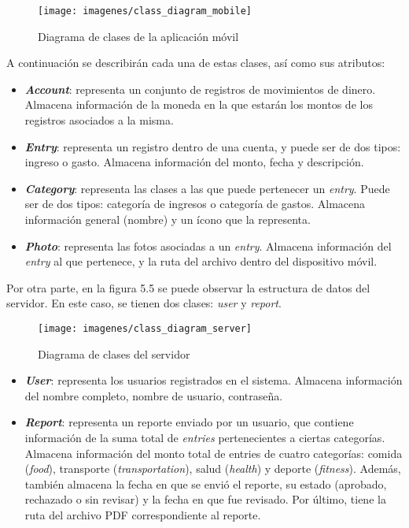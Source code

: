 \begin{figure}[ht]
  \centering
  \texttt{[image: imagenes/class\_diagram\_mobile]}
  \caption{Diagrama de clases de la aplicación móvil}
  \label{fig:classDiagramMobile}
\end{figure}

A continuación se describirán cada una de estas clases, así como sus atributos:

\begin{itemize}
	\item \textbf{\textit{Account}}: representa un conjunto de registros de movimientos de dinero. Almacena información de la moneda en la que estarán los montos de los registros asociados a la misma.
	\item \textbf{\textit{Entry}}: representa un registro dentro de una cuenta, y puede ser de dos tipos: ingreso o gasto. Almacena información del monto, fecha y descripción.
	\item \textbf{\textit{Category}}: representa las clases a las que puede pertenecer un \textit{entry}. Puede ser de dos tipos: categoría de ingresos o categoría de gastos. Almacena información general (nombre) y un ícono que la representa.
	\item \textbf{\textit{Photo}}: representa las fotos asociadas a un \textit{entry}. Almacena información del \textit{entry} al que pertenece, y la ruta del archivo dentro del dispositivo móvil.
\end{itemize}

Por otra parte, en la figura 5.5 se puede observar la estructura de datos del servidor. En este caso, se tienen dos clases: \textit{user} y \textit{report}.

\begin{figure}[ht]
  \centering
  \texttt{[image: imagenes/class\_diagram\_server]}
  \caption{Diagrama de clases del servidor}
  \label{fig:classDiagramServer}
\end{figure}


\begin{itemize}
	\item \textbf{\textit{User}}: representa los usuarios registrados en el sistema. Almacena información del nombre completo, nombre de usuario, contraseña.
	\item \textbf{\textit{Report}}: representa un reporte enviado por un usuario, que contiene información de la suma total de \textit{entries} pertenecientes a ciertas categorías. Almacena información del monto total de entries de cuatro categorías: comida (\textit{food}), transporte (\textit{transportation}), salud (\textit{health}) y deporte (\textit{fitness}). Además, también almacena la fecha en que se envió el reporte, su estado (aprobado, rechazado o sin revisar) y la fecha en que fue revisado. Por último, tiene la ruta del archivo PDF correspondiente al reporte.
\end{itemize} 

